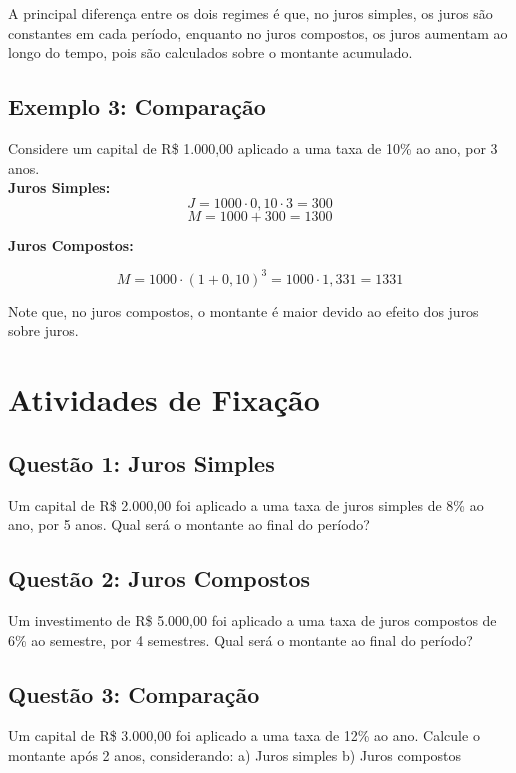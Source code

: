 \documentclass[11pt]{article}
\begin{document}
\begin{multicols}{2}
A principal diferença entre os dois regimes é que, no juros simples, os juros são constantes em cada período, enquanto no juros compostos, os juros aumentam ao longo do tempo, pois são calculados sobre o montante acumulado.

\subsection*{Exemplo 3: Comparação}

Considere um capital de R\$ 1.000,00 aplicado a uma taxa de 10\% ao ano, por 3 anos. \\

\textbf{Juros Simples:}
\[
J = 1000 \cdot 0,10 \cdot 3 = 300
\]
\[
M = 1000 + 300 = 1300
\]

\textbf{Juros Compostos:}

\[
M = 1000 \cdot (1 + 0,10)^3 = 1000 \cdot 1,331 = 1331
\]

Note que, no juros compostos, o montante é maior devido ao efeito dos juros sobre juros.

\section*{Atividades de Fixação}

\subsection*{Questão 1: Juros Simples}

Um capital de R\$ 2.000,00 foi aplicado a uma taxa de juros simples de 8\% ao ano, por 5 anos. Qual será o montante ao final do período?

\subsection*{Questão 2: Juros Compostos}

Um investimento de R\$ 5.000,00 foi aplicado a uma taxa de juros compostos de 6\% ao semestre, por 4 semestres. Qual será o montante ao final do período?

\subsection*{Questão 3: Comparação}

Um capital de R\$ 3.000,00 foi aplicado a uma taxa de 12\% ao ano. Calcule o montante após 2 anos, considerando:
a) Juros simples  
b) Juros compostos  


\end{multicols}
\end{document}
